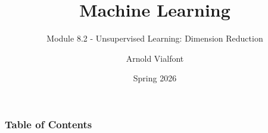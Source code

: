 


\title{Machine Learning}
\subtitle{Module 8.2 - Unsupervised Learning: Dimension Reduction}
\author[A. Vialfont]{Arnold Vialfont}
\date{Spring 2026}

\begin{frame}
  \titlepage
\end{frame}
\begin{frame}
\frametitle{Table of Contents}
	\tableofcontents
\end{frame}
